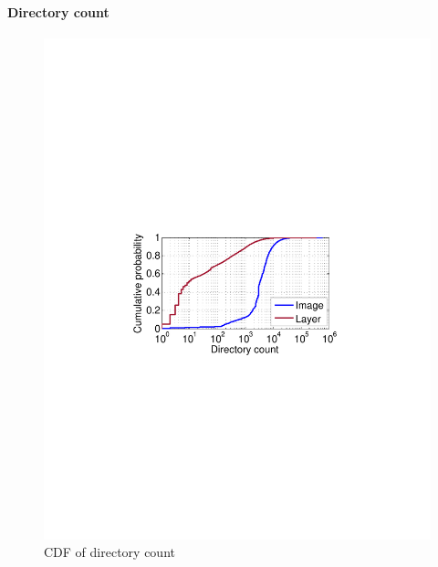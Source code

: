 \paragraph{Directory count}
\begin{figure}[t]
	\centering
	\begin{minipage}{0.22\textwidth}
		\centering
		\includegraphics[width=1\textwidth]{graphs/dir-cnt-cdf.pdf}
		\caption{CDF of directory count}
		\label{fig:dir-cnt-cdf}
	\end{minipage}%
	\begin{minipage}{0.22\textwidth}
		\centering

\end{minipage}
\end{figure}
